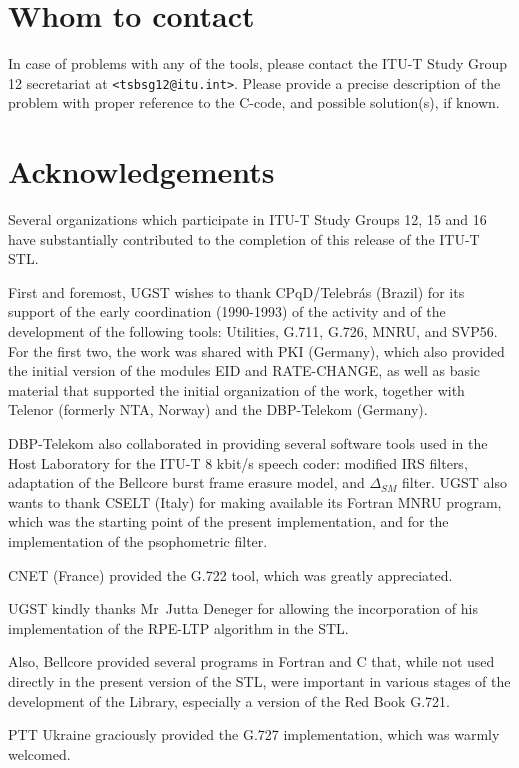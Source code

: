 \section{Whom to contact}

In case of problems with any of the tools, please contact the ITU-T Study Group 12 secretariat at {\tt <tsbsg12@itu.int>}.
Please provide a precise description of the problem with proper reference to the C-code, and possible solution(s), if known.

\section{Acknowledgements}

Several organizations which participate in ITU-T Study Groups 12, 15 and 16 have substantially contributed to the completion of this release of the ITU-T STL.

First and foremost, UGST wishes to thank CPqD/Telebr\'as (Brazil) for its support of the early coordination (1990-1993) of the activity and of the development of the following tools: Utilities, G.711, G.726, MNRU, and SVP56.
For the first two, the work was shared with PKI (Germany), which also provided the initial version of the modules EID and RATE-CHANGE, as well as basic material that supported the initial organization of the work, together with Telenor (formerly NTA, Norway) and the DBP-Telekom (Germany).

DBP-Telekom also collaborated in providing several software tools used in the Host Laboratory for the ITU-T 8 kbit/s speech coder: modified IRS filters, adaptation of the Bellcore burst frame erasure model, and $\Delta_{SM}$ filter.
UGST also wants to thank CSELT (Italy) for making available its Fortran MNRU program, which was the starting point of the present implementation, and for the implementation of the psophometric filter.

CNET (France) provided the G.722 tool, which was greatly appreciated.

UGST kindly thanks Mr~Jutta Deneger for allowing the incorporation of his implementation of the RPE-LTP algorithm in the STL.

Also, Bellcore provided several programs in Fortran and C that, while not used directly in the present version of the STL, were important in various stages of the development of the Library, especially a version of the Red Book G.721.

PTT Ukraine graciously provided the G.727 implementation, which was warmly welcomed.

